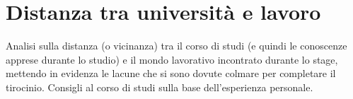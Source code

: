 \section{Distanza tra università e lavoro}
Analisi sulla distanza (o vicinanza) tra il corso di studi (e quindi le conoscenze apprese durante lo studio) e il mondo lavorativo incontrato durante lo stage, mettendo in evidenza le lacune che si sono dovute colmare per completare il tirocinio.
Consigli al corso di studi sulla base dell'esperienza personale.
